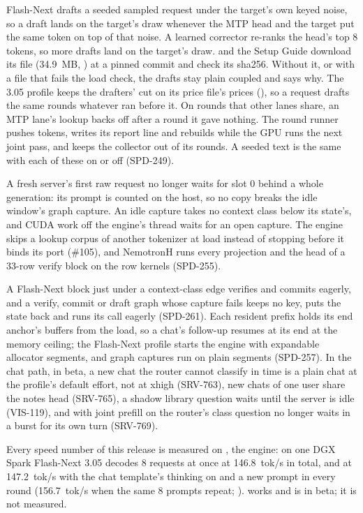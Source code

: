 Flash-Next drafts a seeded sampled request under the target's own keyed noise, so a draft lands on the target's draw whenever the MTP head and the target put the same token on top of that noise. A learned corrector re-ranks the head's top 8 tokens, so more drafts land on the target's draw.  and the Setup Guide download its file (34.9~MB, ) at a pinned commit and check its sha256. Without it, or with a file that fails the load check, the drafts stay plain coupled and  says why. The 3.05 profile keeps the drafters' cut on its price file's prices (), so a request drafts the same rounds whatever ran before it. On rounds that other lanes share, an MTP lane's lookup backs off after a round it gave nothing. The round runner pushes tokens, writes its report line and rebuilds  while the GPU runs the next joint pass, and keeps the collector out of its rounds. A seeded text is the same with each of these on or off (SPD-249).

A fresh server's first raw request no longer waits for slot 0 behind a whole generation: its prompt is counted on the host, so no copy breaks the idle window's graph capture. An idle capture takes no context class below its state's, and CUDA work off the engine's thread waits for an open capture. The engine skips a lookup corpus of another tokenizer at load instead of stopping before it binds its port (\#105), and NemotronH runs every projection and the head of a 33-row verify block on the row kernels (SPD-255).

A Flash-Next block just under a context-class edge verifies and commits eagerly, and a verify, commit or draft graph whose capture fails keeps no key, puts the state back and runs its call eagerly (SPD-261). Each resident prefix holds its end anchor's buffers from the load, so a chat's follow-up resumes at its end at the memory ceiling; the Flash-Next profile starts the engine with expandable allocator segments, and graph captures run on plain segments (SPD-257). In the chat path, in beta, a new chat the router cannot classify in time is a plain chat at the profile's default effort, not  at xhigh (SRV-763), new chats of one user share the notes head (SRV-765), a shadow library question waits until the server is idle (VIS-119), and with joint prefill on the router's class question no longer waits in a burst for its own turn (SRV-769).

Every speed number of this release is measured on , the engine: on one DGX Spark Flash-Next 3.05 decodes 8 requests at once at 146.8~tok/s in total, and at 147.2~tok/s with the chat template's thinking on and a new prompt in every round (156.7~tok/s when the same 8 prompts repeat; \measured).  works and is in beta; it is not measured.

